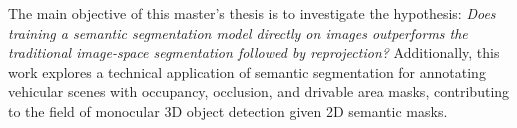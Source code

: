 The main objective of this master's thesis is to investigate the hypothesis: \textit{Does training a semantic segmentation model directly on  images outperforms the traditional image-space segmentation followed by  reprojection?} Additionally, this work explores a technical application of  semantic segmentation for annotating vehicular scenes with occupancy, occlusion, and drivable area masks, contributing to the field of monocular 3D object detection given 2D semantic masks.








